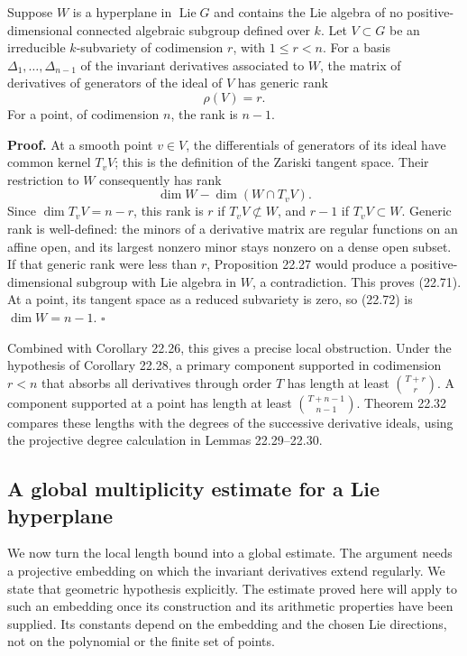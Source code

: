 \documentclass[
  11pt,
  a4paper,
]{article}
\begin{document}
Suppose \(W\) is a hyperplane in \(\operatorname{Lie}G\) and contains
the Lie algebra of no positive-dimensional connected algebraic subgroup
defined over \(k\). Let \(V\subset G\) be an irreducible
\(k\)-subvariety of codimension \(r\), with \(1\le r<n\). For a basis
\(\Delta_1,\ldots,\Delta_{n-1}\) of the invariant derivatives associated
to \(W\), the matrix of derivatives of generators of the ideal of \(V\)
has generic rank \[
 \rho(V)=r.
 \tag{22.71}
\] For a point, of codimension \(n\), the rank is \(n-1\).

\textbf{Proof.} At a smooth point \(v\in V\), the differentials of
generators of its ideal have common kernel \(T_vV\); this is the
definition of the Zariski tangent space. Their restriction to \(W\)
consequently has rank \[
 \dim W-\dim(W\cap T_vV).
 \tag{22.72}
\] Since \(\dim T_vV=n-r\), this rank is \(r\) if \(T_vV\not\subset W\),
and \(r-1\) if \(T_vV\subset W\). Generic rank is well-defined: the
minors of a derivative matrix are regular functions on an affine open,
and its largest nonzero minor stays nonzero on a dense open subset. If
that generic rank were less than \(r\), Proposition 22.27 would produce
a positive-dimensional subgroup with Lie algebra in \(W\), a
contradiction. This proves (22.71). At a point, its tangent space as a
reduced subvariety is zero, so (22.72) is \(\dim W=n-1\). \(\square\)

Combined with Corollary 22.26, this gives a precise local obstruction.
Under the hypothesis of Corollary 22.28, a primary component supported
in codimension \(r<n\) that absorbs all derivatives through order \(T\)
has length at least \(\binom{T+r}{r}\). A component supported at a point
has length at least \(\binom{T+n-1}{n-1}\). Theorem 22.32 compares these
lengths with the degrees of the successive derivative ideals, using the
projective degree calculation in Lemmas 22.29--22.30.

\subsection{A global multiplicity estimate for a Lie
hyperplane}\label{a-global-multiplicity-estimate-for-a-lie-hyperplane}

We now turn the local length bound into a global estimate. The argument
needs a projective embedding on which the invariant derivatives extend
regularly. We state that geometric hypothesis explicitly. The estimate
proved here will apply to such an embedding once its construction and
its arithmetic properties have been supplied. Its constants depend on
the embedding and the chosen Lie directions, not on the polynomial or
the finite set of points.
\end{document}

